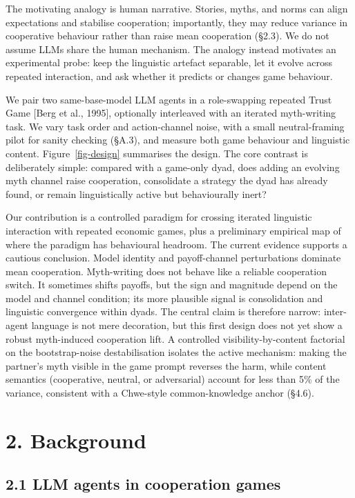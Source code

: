 \documentclass[
  10pt,
  letterpaper,
]{article}
\begin{document}
The motivating analogy is human narrative. Stories, myths, and norms can
align expectations and stabilise cooperation; importantly, they may
reduce variance in cooperative behaviour rather than raise mean
cooperation (§2.3). We do not assume LLMs share the human mechanism. The
analogy instead motivates an experimental probe: keep the linguistic
artefact separable, let it evolve across repeated interaction, and ask
whether it predicts or changes game behaviour.

We pair two same-base-model LLM agents in a role-swapping repeated Trust
Game {[}Berg et al., 1995{]}, optionally interleaved with an iterated
myth-writing task. We vary task order and action-channel noise, with a
small neutral-framing pilot for sanity checking (§A.3), and measure both
game behaviour and linguistic content. Figure~\ref{fig-design}
summarises the design. The core contrast is deliberately simple:
compared with a game-only dyad, does adding an evolving myth channel
raise cooperation, consolidate a strategy the dyad has already found, or
remain linguistically active but behaviourally inert?

Our contribution is a controlled paradigm for crossing iterated
linguistic interaction with repeated economic games, plus a preliminary
empirical map of where the paradigm has behavioural headroom. The
current evidence supports a cautious conclusion. Model identity and
payoff-channel perturbations dominate mean cooperation. Myth-writing
does not behave like a reliable cooperation switch. It sometimes shifts
payoffs, but the sign and magnitude depend on the model and channel
condition; its more plausible signal is consolidation and linguistic
convergence within dyads. The central claim is therefore narrow:
inter-agent language is not mere decoration, but this first design does
not yet show a robust myth-induced cooperation lift. A controlled
visibility-by-content factorial on the bootstrap-noise destabilisation
isolates the active mechanism: making the partner's myth visible in the
game prompt reverses the harm, while content semantics (cooperative,
neutral, or adversarial) account for less than 5\% of the variance,
consistent with a Chwe-style common-knowledge anchor (§4.6).

\section{2. Background}\label{background}

\subsection{2.1 LLM agents in cooperation
games}\label{llm-agents-in-cooperation-games}
\end{document}
